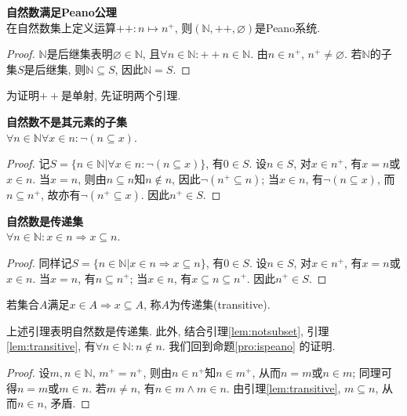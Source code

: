 \begin{pro}\textbf{自然数满足Peano公理}\\
在自然数集上定义运算$++:n\mapsto n^+$, 则$(\mathbb{N}, ++, \varnothing)$是Peano系统. 
\label{pro:ispeano}
\end{pro}
\begin{proof}
$\mathbb{N}$是后继集表明$\varnothing \in \mathbb{N}$, 且$\forall n\in \mathbb{N}: ++n \in \mathbb{N}$. 由$n\in n^+$, $n^+\neq \varnothing$. 若$\mathbb{N}$的子集$S$是后继集, 则$\mathbb{N}\subseteq S$, 因此$\mathbb{N}=S$. 
\end{proof}
\par 为证明$++$是单射, 先证明两个引理.

\begin{lem}\textbf{自然数不是其元素的子集}\\
$\forall n\in \mathbb{N} \forall x \in n: \lnot (n\subseteq x)$.
\label{lem:notsubset}
\end{lem}
\begin{proof}
记$S=\{n\in \mathbb{N} \vert \forall x \in n: \lnot (n\subseteq x)\}$, 有$0\in S$. 设$n\in S$, 对$x\in n^+$, 有$x=n$或$x\in n$. 当$x=n$, 则由$n\subseteq n$知$n\notin n$, 因此$\lnot (n^+ \subseteq n)$; 当$x\in n$, 有$\lnot(n\subseteq x)$, 而$n \subseteq n^+$, 故亦有$\lnot(n^+\subseteq x)$. 因此$n^+\in S$. 
\end{proof} 

\begin{lem}\textbf{自然数是传递集}\\
$\forall n\in \mathbb{N}: x \in n\Rightarrow x\subseteq n$.
\label{lem:transitive}
\end{lem}
\begin{proof}
同样记$S=\{n\in \mathbb{N} \vert x \in n\Rightarrow x\subseteq n\}$, 有$0\in S$. 设$n\in S$, 对$x\in n^+$, 有$x=n$或$x\in n$. 当$x=n$, 有$n\subseteq n^+$; 当$x\in n$, 有$x\subseteq n \subseteq n^+$. 因此$n^+\in S$. 
\end{proof}

\par 若集合$A$满足$x\in A\Rightarrow x\subseteq A$, 称$A$为传递集(transitive). 

\par 上述引理表明自然数是传递集. 此外, 结合引理\ref{lem:notsubset}, 引理\ref{lem:transitive}, 有$\forall n\in \mathbb{N}: n\notin n$. 我们回到命题\ref{pro:ispeano} 的证明. 
\begin{proof}
\par 设$m,n\in \mathbb{N}$, $m^+=n^+$, 则由$n\in n^+$知$n\in m^+$, 从而$n=m$或$n\in m$; 同理可得$n=m$或$m\in n$. 若$m\neq n$, 有$n\in m \land m\in n$. 由引理\ref{lem:transitive}, $m\subseteq n$, 从而$n\in n$, 矛盾. 
\end{proof} 

